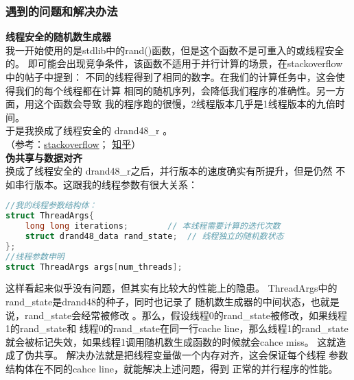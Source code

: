 \documentclass{SYSUReport}
\begin{document}
\subsubsection{遇到的问题和解决办法}
\textbf{线程安全的随机数生成器}\\
我一开始使用的是stdlib中的rand()函数，但是这个函数不是可重入的或线程安全的。
即可能会出现竞争条件，该函数不适用于并行计算的场景，在stackoverflow中的帖子中提到：
不同的线程得到了相同的数字。在我们的计算任务中，这会使得我们的每个线程都在计算
相同的随机序列，会降低我们程序的准确性。另一方面，用这个函数会导致
我的程序跑的很慢，2线程版本几乎是1线程版本的九倍时间。\\
于是我换成了线程安全的 drand48\_r 。\\
（参考：\href{https://stackoverflow.org.cn/questions/6161322}{stackoverflow}； \href{https://zhuanlan.zhihu.com/p/337921529}{知乎}）\\
\textbf{伪共享与数据对齐}\\
换成了线程安全的 drand48\_r之后，并行版本的速度确实有所提升，但是仍然
不如串行版本。这跟我的线程参数有很大关系：
\begin{lstlisting}[language=c]
//我的线程参数结构体：
struct ThreadArgs{
    long long iterations;        // 本线程需要计算的迭代次数
    struct drand48_data rand_state;  // 线程独立的随机数状态
};    
//线程参数申明
struct ThreadArgs args[num_threads];
\end{lstlisting}
这样看起来似乎没有问题，但其实有比较大的性能上的隐患。
ThreadArgs中的rand\_state是drand48的种子，同时也记录了
随机数生成器的中间状态，也就是说，rand\_state会经常被修改
。那么，假设线程0的rand\_state被修改，如果线程1的rand\_state和
线程0的rand\_state在同一行cache line，那么线程1的rand\_state
就会被标记失效，如果线程1调用随机数生成函数的时候就会cahce miss。
这就造成了伪共享。
解决办法就是把线程变量做一个内存对齐，这会保证每个线程
参数结构体在不同的cahce line，就能解决上述问题，得到
正常的并行程序的性能。
\end{document}

